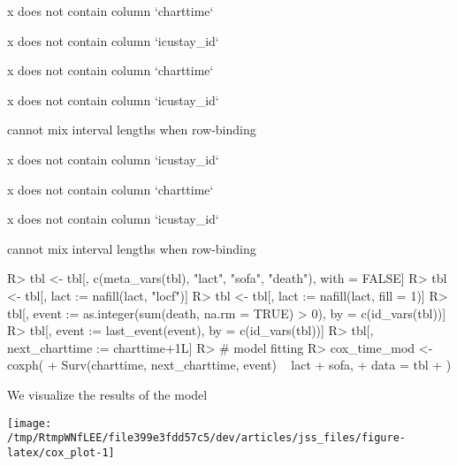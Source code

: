 \documentclass[
]{jss}
\begin{document}
\begin{CodeChunk}
\begin{CodeOutput}
x does not contain column `charttime`
\end{CodeOutput}

\begin{CodeOutput}
x does not contain column `icustay_id`
\end{CodeOutput}

\begin{CodeOutput}
x does not contain column `charttime`
\end{CodeOutput}

\begin{CodeOutput}
x does not contain column `icustay_id`
\end{CodeOutput}

\begin{CodeOutput}
cannot mix interval lengths when row-binding
\end{CodeOutput}

\begin{CodeOutput}
x does not contain column `icustay_id`
\end{CodeOutput}

\begin{CodeOutput}
x does not contain column `charttime`
\end{CodeOutput}

\begin{CodeOutput}
x does not contain column `icustay_id`
\end{CodeOutput}

\begin{CodeOutput}
cannot mix interval lengths when row-binding
\end{CodeOutput}

\begin{CodeInput}
R> tbl <- tbl[, c(meta_vars(tbl), "lact", "sofa", "death"), with = FALSE]
R> tbl <- tbl[, lact := nafill(lact, "locf")]
R> tbl <- tbl[, lact := nafill(lact, fill = 1)]
R> tbl[, event := as.integer(sum(death, na.rm = TRUE) > 0), by = c(id_vars(tbl))]
R> tbl[, event := last_event(event), by = c(id_vars(tbl))]
R> tbl[, next_charttime := charttime+1L]
R> # model fitting
R> cox_time_mod <- coxph(
+   Surv(charttime, next_charttime, event) ~ lact + sofa,
+   data = tbl
+ )
\end{CodeInput}
\end{CodeChunk}

We visualize the results of the model

\begin{CodeChunk}


\begin{center}\texttt{[image: /tmp/RtmpWNfLEE/file399e3fdd57c5/dev/articles/jss\_files/figure-latex/cox\_plot-1]} \end{center}

\end{CodeChunk}
\end{document}
